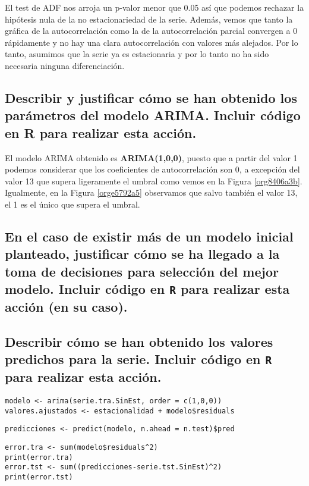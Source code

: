 \documentclass[11pt]{article}
\begin{document}
El test de ADF nos arroja un p-valor menor que 0.05 así que podemos
rechazar la hipótesis nula de la no estacionariedad de la
serie. Además, vemos que tanto la gráfica de la autocorrelación
como la de la autocorrelación parcial convergen a 0 rápidamente y
no hay una clara autocorrelación con valores más alejados.  Por lo
tanto, asumimos que la serie ya es estacionaria y por lo tanto no ha
sido necesaria ninguna diferenciación.

\subsection{Describir y justificar cómo se han obtenido los parámetros del modelo ARIMA. Incluir código en R para realizar esta acción.}
\label{sec:org60479c9}


El modelo ARIMA obtenido es \textbf{ARIMA(1,0,0)}, puesto que a partir del
valor 1 podemos considerar que los coeficientes de autocorrelación son
0, a excepción del valor 13 que supera ligeramente el
umbral como vemos en la Figura \ref{org8406a3b}. Igualmente, en la Figura
\ref{orge5792a5} observamos que salvo también el valor 13, el 1 es el único
que supera el umbral. 


\subsection{En el caso de existir más de un modelo inicial planteado, justificar cómo se ha llegado a la toma de decisiones para selección del mejor modelo. Incluir código en \texttt{R} para realizar esta acción (en su caso).}
\label{sec:org926a284}
\subsection{Describir cómo se han obtenido los valores predichos para la serie. Incluir código en \texttt{R} para realizar esta acción.}
\label{sec:orga0feaec}
\begin{verbatim}
modelo <- arima(serie.tra.SinEst, order = c(1,0,0))
valores.ajustados <- estacionalidad + modelo$residuals
\end{verbatim}


\begin{verbatim}
predicciones <- predict(modelo, n.ahead = n.test)$pred
\end{verbatim}

\begin{verbatim}
error.tra <- sum(modelo$residuals^2)
print(error.tra)
error.tst <- sum((predicciones-serie.tst.SinEst)^2)
print(error.tst)
\end{verbatim}
\end{document}
